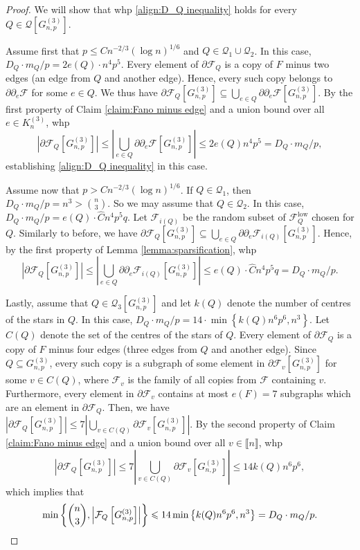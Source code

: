 \documentclass[11pt,a4paper,oneside,reqno]{amsart}
\newcommand{\Gnp}{G_{n, p}^{(3)}}
\newcommand{\cF}{\mathcal{F}}
\newcommand{\cQ}{\mathcal{Q}}
\newcommand{\1}{\mathbbm{1}} %
\newcommand{\br}[1]{\llbracket{#1}\rrbracket}
\renewcommand{\le}{\leqslant}
\newcommand{\cFQL}{\cF_Q^{\mathrm{low}}}
\begin{document}
\begin{proof}
    We will show that whp \eqref{align:D_Q inequality} holds for every $Q \in \cQ\left[\Gnp\right]$.

    Assume first that $p \le C n^{-2/3} \left(\log n\right)^{1/6}$ and $Q \in \cQ_1 \cup \cQ_2$. In this case, $D_Q \cdot m_Q / p = 2 e(Q) \cdot n^4 p^5$. Every element of $\partial \cF_Q$ is a copy of $F$ minus two edges (an edge from $Q$ and another edge). Hence, every such copy belongs to $\partial \partial_e \cF$ for some $e \in Q$. We thus have
    $\partial \cF_Q\left[\Gnp\right] \subseteq \bigcup_{e \in Q} \partial \partial_e \cF\left[\Gnp\right]$.
    By the first property of Claim \ref{claim:Fano minus edge} and a union bound over all $e \in K_n^{(3)}$, whp
    \[
        \left|\partial \cF_Q\left[\Gnp\right]\right| \le \left|\bigcup_{e \in Q} \partial \partial_e \cF\left[\Gnp\right]\right| \le 2 e(Q) n^4 p^5 = D_Q \cdot m_Q / p,
    \]
    establishing \eqref{align:D_Q inequality} in this case.
    
    Assume now that $p > C n^{-2/3} \left(\log n\right)^{1/6}$. If $Q \in \cQ_1$, then $D_Q \cdot m_Q / p = n^3 > \binom{n}{3}$. So we may assume that $Q \in \cQ_2$. In this case, $D_Q \cdot m_Q / p = e(Q) \cdot \hat{C} n^4 p^5 q$. Let $\cF_{i(Q)}$ be the random subset of $\cFQL$ chosen for $Q$. Similarly to before, we have $\partial \cF_Q\left[\Gnp\right] \subseteq \bigcup_{e \in Q} \partial \partial_e \cF_{i(Q)}\left[\Gnp\right]$. Hence, by the first property of Lemma \ref{lemma:sparsification}, whp
    \[
        \left|\partial \cF_Q\left[\Gnp\right]\right| \le \left|\bigcup_{e \in Q} \partial \partial_e \cF_{i(Q)}\left[\Gnp\right]\right| \le e(Q) \cdot \hat{C} n^4 p^5 q = D_Q \cdot m_Q / p.
    \]

    Lastly, assume that $Q \in \cQ_3\left[\Gnp\right]$ and let $k(Q)$ denote the number of centres of the stars in $Q$. In this case, $D_Q \cdot m_Q / p = 14 \cdot \min\left\{k(Q) n^6 p^6, n^3\right\}$. Let $C(Q)$ denote the set of the centres of the stars of $Q$. Every element of $\partial \cF_Q$ is a copy of $F$ minus four edges (three edges from $Q$ and another edge). Since $Q \subseteq \Gnp$, every such copy is a subgraph of some element in $\partial \cF_v\left[\Gnp\right]$ for some $v \in C(Q)$, where $\cF_v$ is the family of all copies from $\cF$ containing $v$. Furthermore, every element in $\partial \cF_v$ contains at most $e(F)=7$ subgraphs which are an element in $\partial \cF_Q$. Then, we have 
    $\left|\partial \cF_Q\left[\Gnp\right]\right| \le 7 \left|\bigcup_{v \in C(Q)} \partial \cF_v\left[\Gnp\right]\right|$.
    By the second property of Claim \ref{claim:Fano minus edge} and a union bound over all $v \in \br{n}$, whp
    \[
        \left|\partial \cF_Q\left[\Gnp\right]\right| \le 7\left|\bigcup_{v \in C(Q)} \partial  \cF_v\left[\Gnp\right]\right| \le 14 k(Q) n^6 p^6,
    \]
    which implies that
    \[
        \min\left\{\binom{n}{3}, \left|\cF_Q\left[\Gnp\right]\right|\right\} \le 14 \min\left\{k(Q) n^6 p^6, n^3\right\} = D_Q \cdot m_Q / p. \qedhere
    \]
\end{proof}
\end{document}

